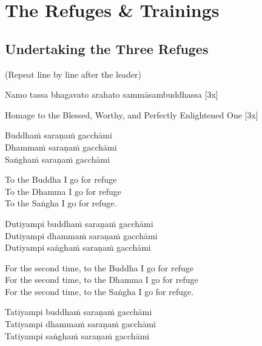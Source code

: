 \section{The Refuges \& Trainings}

\subsection{Undertaking the Three Refuges}

\begin{center}
  (Repeat line by line after the leader)\hyperlink{endnote135-appendix}{\hypertarget{endnote135-body}{}}
\end{center}

Namo tassa bhagavato arahato sammāsambuddhassa \hfill{[3x]}

\begin{english}
  Homage to the Blessed, Worthy, and Perfectly Enlightened One \hfill{[3x]}
\end{english}

Buddhaṁ saraṇaṁ gacchāmi\\
Dhammaṁ saraṇaṁ gacchāmi\\
Saṅghaṁ saraṇaṁ gacchāmi

\begin{english-verses}
  To the Buddha I go for refuge\\
  To the Dhamma I go for refuge\\
  To the Saṅgha I go for refuge.
\end{english-verses}

Dutiyampi buddhaṁ saraṇaṁ gacchāmi\\
Dutiyampi dhammaṁ saraṇaṁ gacchāmi\\
Dutiyampi saṅghaṁ saraṇaṁ gacchāmi

\begin{english-verses}
  For the second time, to the Buddha I go for refuge\\
  For the second time, to the Dhamma I go for refuge\\
  For the second time, to the Saṅgha I go for refuge.
\end{english-verses}

Tatiyampi buddhaṁ saraṇaṁ gacchāmi\\
Tatiyampi dhammaṁ saraṇaṁ gacchāmi\\
Tatiyampi saṅghaṁ saraṇaṁ gacchāmi

